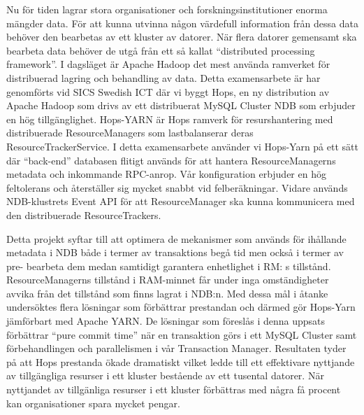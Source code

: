  Nu för tiden lagrar stora organisationer och forskningsinstitutioner enorma mängder data.
För att kunna utvinna någon värdefull information från dessa data behöver den bearbetas
av ett kluster av datorer. När flera datorer gemensamt ska bearbeta data behöver de utgå
från ett så kallat ``distributed processing framework''. I dagsläget är Apache Hadoop det
mest använda ramverket för distribuerad lagring och behandling av data. Detta examensarbete
är har genomförts vid SICS Swedish ICT där vi byggt Hops, en ny distribution av
Apache Hadoop som drivs av ett distribuerat MySQL Cluster NDB som erbjuder en hög tillgänglighet.
Hops-YARN är Hops ramverk för resurshantering med distribuerade ResourceManagers som lastbalanserar
deras ResourceTrackerService. I detta examensarbete använder vi Hops-Yarn på ett sätt där ``back-end''
databasen flitigt används för att hantera ResourceManagerns metadata och inkommande RPC-anrop. Vår
konfiguration erbjuder en hög feltolerans och återställer sig mycket snabbt vid
felberäkningar. Vidare används NDB-klustrets Event API för att ResourceManager ska kunna
kommunicera med den distribuerade ResourceTrackers.

Detta projekt syftar till att optimera de mekanismer som används för ihållande metadata
i NDB både i termer av transaktions begå tid men också i termer av pre-
bearbeta dem medan samtidigt garantera enhetlighet i RM: s tillstånd. ResourceManagerns tillstånd
i RAM-minnet får under inga omständigheter
avvika från det tillstånd som finns lagrat i NDB:n. Med dessa mål i åtanke undersöktes flera
lösningar som förbättrar prestandan och därmed gör Hops-Yarn jämförbart med Apache YARN.
De lösningar som föreslås i denna uppsats förbättrar “pure commit time” när en transaktion
görs i ett MySQL Cluster samt förbehandlingen och parallelismen i vår Transaction Manager.
Resultaten tyder på att Hops prestanda ökade dramatiskt vilket ledde till ett effektivare
nyttjande av tillgängliga resurser i ett kluster bestående av ett tusental datorer. När
nyttjandet av tillgänliga resurser i ett kluster förbättras med några få procent kan
organisationer spara mycket pengar.

